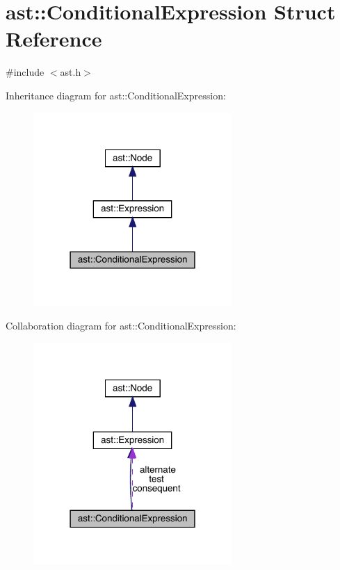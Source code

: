 \hypertarget{structast_1_1_conditional_expression}{}\section{ast\+:\+:Conditional\+Expression Struct Reference}
\label{structast_1_1_conditional_expression}


{\ttfamily \#include $<$ast.\+h$>$}



Inheritance diagram for ast\+:\+:Conditional\+Expression\+:
\nopagebreak
\begin{figure}[H]
\begin{center}
\leavevmode
\includegraphics[width=214pt]{structast_1_1_conditional_expression__inherit__graph}
\end{center}
\end{figure}


Collaboration diagram for ast\+:\+:Conditional\+Expression\+:
\nopagebreak
\begin{figure}[H]
\begin{center}
\leavevmode
\includegraphics[width=214pt]{structast_1_1_conditional_expression__coll__graph}
\end{center}
\end{figure}
